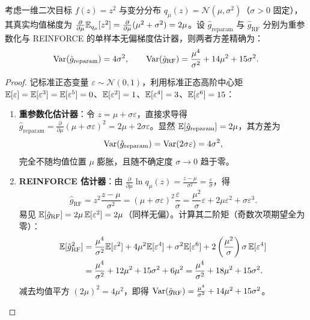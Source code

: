 \begin{thmBox}
\begin{proposition}
\label{prop:reparam-var}
考虑一维二次目标 $f(z) = z^2$ 与变分分布 $q_\mu(z) = \mathcal{N}(\mu, \sigma^2)$（$\sigma > 0$ 固定），其真实均值梯度为 $\frac{\partial}{\partial \mu}\mathbb{E}_{q_\mu}[z^2] = \frac{\partial}{\partial \mu}(\mu^2 + \sigma^2) = 2\mu$。设 $\hat{g}_{\mathrm{reparam}}$ 与 $\hat{g}_{\mathrm{RF}}$ 分别为重参数化与 REINFORCE 的单样本无偏梯度估计器，则两者方差精确为：
\begin{equation}
  \operatorname{Var}(\hat{g}_{\mathrm{reparam}}) = 4\sigma^2,
  \qquad
  \operatorname{Var}(\hat{g}_{\mathrm{RF}}) = \frac{\mu^4}{\sigma^2} + 14\mu^2 + 15\sigma^2.
  \label{eq:reparam-vs-rf-var}
\end{equation}
\end{proposition}
\begin{proof}
记标准正态变量 $\varepsilon \sim \mathcal{N}(0, 1)$，利用标准正态高阶中心矩 $\mathbb{E}[\varepsilon] = \mathbb{E}[\varepsilon^3] = \mathbb{E}[\varepsilon^5] = 0$、$\mathbb{E}[\varepsilon^2] = 1$、$\mathbb{E}[\varepsilon^4] = 3$、$\mathbb{E}[\varepsilon^6] = 15$：
\begin{enumerate}
  \item \textbf{重参数化估计器}：令 $z = \mu + \sigma \varepsilon$，直接求导得 $\hat{g}_{\mathrm{reparam}} = \frac{\partial}{\partial \mu}(\mu + \sigma\varepsilon)^2 = 2\mu + 2\sigma\varepsilon$。显然 $\mathbb{E}[\hat{g}_{\mathrm{reparam}}] = 2\mu$，其方差为
  \[
    \operatorname{Var}(\hat{g}_{\mathrm{reparam}}) = \operatorname{Var}(2\sigma\varepsilon) = 4\sigma^2,
  \]
  完全不随均值位置 $\mu$ 膨胀，且随不确定度 $\sigma \to 0$ 趋于零。
  \item \textbf{REINFORCE 估计器}：由 $\frac{\partial}{\partial \mu}\ln q_\mu(z) = \frac{z - \mu}{\sigma^2} = \frac{\varepsilon}{\sigma}$，得
  \[
    \hat{g}_{\mathrm{RF}} = z^2 \frac{z - \mu}{\sigma^2}
    = (\mu + \sigma\varepsilon)^2 \frac{\varepsilon}{\sigma}
    = \frac{\mu^2}{\sigma}\varepsilon + 2\mu\varepsilon^2 + \sigma\varepsilon^3.
  \]
  易见 $\mathbb{E}[\hat{g}_{\mathrm{RF}}] = 2\mu\,\mathbb{E}[\varepsilon^2] = 2\mu$（同样无偏）。计算其二阶矩（奇数次项期望全为零）：
  \begin{align*}
    \mathbb{E}[\hat{g}_{\mathrm{RF}}^2]
    &= \frac{\mu^4}{\sigma^2}\mathbb{E}[\varepsilon^2] + 4\mu^2\mathbb{E}[\varepsilon^4] + \sigma^2\mathbb{E}[\varepsilon^6] + 2\left(\frac{\mu^2}{\sigma}\right)\sigma\,\mathbb{E}[\varepsilon^4] \\
    &= \frac{\mu^4}{\sigma^2} + 12\mu^2 + 15\sigma^2 + 6\mu^2
    = \frac{\mu^4}{\sigma^2} + 18\mu^2 + 15\sigma^2.
  \end{align*}
  减去均值平方 $(2\mu)^2 = 4\mu^2$，即得 $\operatorname{Var}(\hat{g}_{\mathrm{RF}}) = \frac{\mu^4}{\sigma^2} + 14\mu^2 + 15\sigma^2$。
\end{enumerate}
\end{proof}
\end{thmBox}

